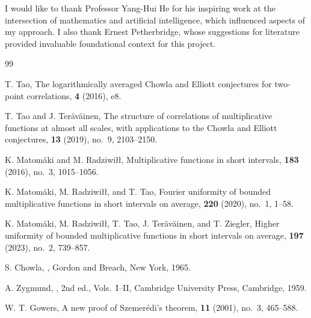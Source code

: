 \documentclass[11pt]{scrartcl}
\numberwithin{equation}{section}
\theoremstyle{definition}
\newcommand{\1}{\mathbf 1}
\begin{document}
I would like to thank Professor Yang-Hui He for his inspiring work at the intersection of mathematics and artificial intelligence, which influenced aspects of my approach. I also thank Ernest Petherbridge, whose suggestions for literature provided invaluable foundational context for this project.

\begin{thebibliography}{99}

T. Tao,
\newblock The logarithmically averaged Chowla and Elliott conjectures for two-point correlations,
 \textbf{4} (2016), e8.

T. Tao and J. Ter\"av\"ainen,
\newblock The structure of correlations of multiplicative functions at almost all scales, with applications to the Chowla and Elliott conjectures,
 \textbf{13} (2019), no.~9, 2103--2150.

K. Matom\"aki and M. Radziwi\l\l,
\newblock Multiplicative functions in short intervals,
 \textbf{183} (2016), no.~3, 1015--1056.

K. Matom\"aki, M. Radziwi\l\l, and T. Tao,
\newblock Fourier uniformity of bounded multiplicative functions in short intervals on average,
 \textbf{220} (2020), no.~1, 1--58.

K. Matom\"aki, M. Radziwi\l\l, T. Tao, J. Ter\"av\"ainen, and T. Ziegler,
\newblock Higher uniformity of bounded multiplicative functions in short intervals on average,
 \textbf{197} (2023), no.~2, 739--857.

S. Chowla,
,
\newblock Gordon and Breach, New York, 1965.

A. Zygmund,
,
\newblock 2nd ed., Vols.~I--II, Cambridge University Press, Cambridge, 1959.

W. T. Gowers,
\newblock A new proof of Szemer\'edi's theorem,
 \textbf{11} (2001), no.~3, 465--588.


\end{thebibliography}
\end{document}
